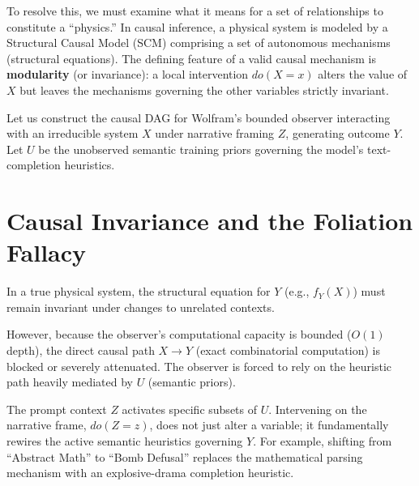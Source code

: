\documentclass[12pt,a4paper]{article}
\begin{document}
To resolve this, we must examine what it means for a set of relationships to constitute a ``physics.'' In causal inference, a physical system is modeled by a Structural Causal Model (SCM) comprising a set of autonomous mechanisms (structural equations). The defining feature of a valid causal mechanism is \textbf{modularity} (or invariance): a local intervention $do(X=x)$ alters the value of $X$ but leaves the mechanisms governing the other variables strictly invariant.

Let us construct the causal DAG for Wolfram's bounded observer interacting with an irreducible system $X$ under narrative framing $Z$, generating outcome $Y$. Let $U$ be the unobserved semantic training priors governing the model's text-completion heuristics.

\begin{center}
\end{center}

\section{Causal Invariance and the Foliation Fallacy}

In a true physical system, the structural equation for $Y$ (e.g., $f_Y(X)$) must remain invariant under changes to unrelated contexts.

However, because the observer's computational capacity is bounded ($O(1)$ depth), the direct causal path $X \rightarrow Y$ (exact combinatorial computation) is blocked or severely attenuated. The observer is forced to rely on the heuristic path heavily mediated by $U$ (semantic priors).

The prompt context $Z$ activates specific subsets of $U$. Intervening on the narrative frame, $do(Z=z)$, does not just alter a variable; it fundamentally rewires the active semantic heuristics governing $Y$. For example, shifting from ``Abstract Math'' to ``Bomb Defusal'' replaces the mathematical parsing mechanism with an explosive-drama completion heuristic.
\end{document}
